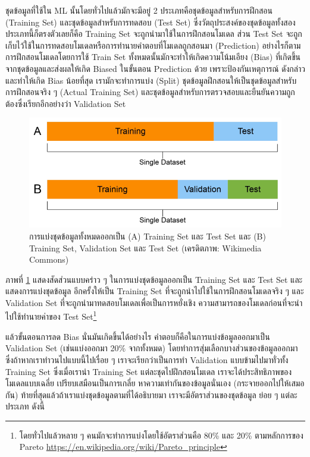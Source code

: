 ชุดข้อมูลที่ใช้ใน ML นั้นโดยทั่วไปแล้วมักจะมีอยู่ 2 ประเภทคือชุดข้อมูลสำหรับการฝึกสอน (Training Set) และชุดข้อมูลสำหรับการทดสอบ 
(Test Set) ซึ่งวัตถุประสงค์ของชุดข้อมูลทั้งสองประเภทนี้ก็ตรงตัวเลยก็คือ Training Set จะถูกนำมาใช้ในการฝึกสอนโมเดล ส่วน Test Set 
จะถูกเก็บไว้ใช้ในการทดสอบโมเดลหรือการทำนายคำตอบที่โมเดลถูกสอนมา (Prediction) อย่างไรก็ตาม การฝึกสอนโมเดลโดยการใช้ Train Set 
ทั้งหมดนั้นมักจะทำให้เกิดความโน้มเอียง (Bias) ที่เกิดขึ้นจากชุดข้อมูลและส่งผลให้เกิด Biased ในขั้นตอน Prediction ด้วย เพราะป้องกันเหตุการณ์%
ดังกล่าวและทำให้เกิด Bias น้อยที่สุด เรามักจะทำการแบ่ง (Split) ชุดข้อมูลฝึกสอนให้เป็นชุดข้อมูลสำหรับการฝึกสอนจริง ๆ (Actual Training 
Set) และชุดข้อมูลสำหรับการตรวจสอบและยืนยันความถูกต้องซึ่งเรียกอีกอย่างว่า Validation Set

\begin{figure}[H]
    \centering
    \includegraphics[width=0.8\linewidth]{fig/dataset.png}
    \caption{การแบ่งชุดข้อมูลทั้งหมดออกเป็น (A) Training Set และ Test Set และ (B) Training Set, Validation Set และ 
    Test Set (เครดิตภาพ: Wikimedia Commons)}
    \label{fig:dataset}
\end{figure}

ภาพที่ \ref{fig:dataset} แสดงสัดส่วนแบบคร่าว ๆ ในการแบ่งชุดข้อมูลออกเป็น Training Set และ Test Set และแสดงการแบ่งชุดข้อมูล%
อีกครั้งให้เป็น Training Set ที่จะถูกนำไปใช้ในการฝึกสอนโมเดลจริง ๆ และ Validation Set ที่จะถูกนำมาทดสอบโมเดลเพื่อเป็นการหยั่งเชิง%
ความสามารถของโมเดลก่อนที่จะนำไปใช้ทำนายค่าของ Test Set\footnote{โดยทั่วไปแล้วหลาย ๆ คนมักจะทำการแบ่งโดยใช้อัตราส่วนคือ 
80\% และ 20\% ตามหลักการของ Pareto \url{https://en.wikipedia.org/wiki/Pareto_principle}}

แล้วขั้นตอนการลด Bias นั่นมันเกิดขึ้นได้อย่างไร คำตอบก็คือในการแบ่งข้อมูลออกมาเป็น Validation Set (เช่นแบ่งออกมา 20\% จากทั้งหมด)
โดยทำการสุ่มเลือกบางส่วนของข้อมูลออกมา ซึ่งถ้าหากเราทำวนไปแบบนี้ไปเรื่อย ๆ เราจะเรียกว่าเป็นการทำ Validation แบบข้ามไปมาทั่วทั้ง 
Training Set ซึ่งเมื่อเรานำ Training Set แต่ละชุดไปฝึกสอนโมเดล เราจะได้ประสิทธิภาพของโมเดลแบบเฉลี่ย เปรียบเสมือนเป็นการเกลี่ย%
หาความเท่ากันของข้อมูลนั่นเอง (กระจายออกไปให้เสมอกัน) ท้ายที่สุดแล้วถ้าเราแบ่งชุดข้อมูลตามที่ได้อธิบายมา เราจะมีอัตราส่วนของชุดข้อมูล%
ย่อย ๆ แต่ละประเภท ดังนี้

